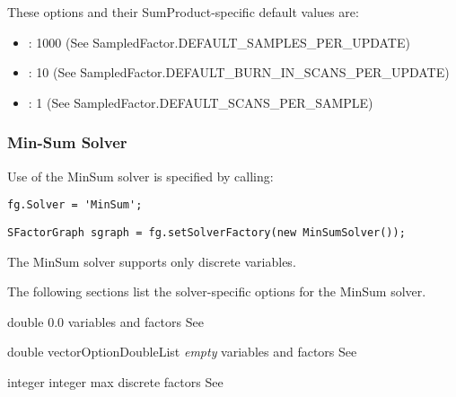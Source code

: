 These options and their SumProduct-specific default values are:

\begin{itemize}
\item {}: 1000 \ifjava (See SampledFactor.DEFAULT\_SAMPLES\_PER\_UPDATE)\fi
\item {}: 10 \ifjava (See SampledFactor.DEFAULT\_BURN\_IN\_SCANS\_PER\_UPDATE)\fi
\item {}: 1 \ifjava (See SampledFactor.DEFAULT\_SCANS\_PER\_SAMPLE)\fi
\end{itemize}

\clearpage
\subsubsection{Min-Sum Solver}

Use of the MinSum solver is specified by calling:

\ifmatlab
\begin{lstlisting}
fg.Solver = 'MinSum';
\end{lstlisting}
\fi

\ifjava
\begin{lstlisting}
SFactorGraph sgraph = fg.setSolverFactory(new MinSumSolver());
\end{lstlisting}
\fi

The MinSum solver supports only discrete variables.

\label{sec:MinSumOptions}

The following sections list the solver-specific options for the MinSum solver.


{double}
{0.0}
{variables and factors}
{See }


{\ifmatlab double vector\fi \ifjava OptionDoubleList\fi}
{\textit{empty}}
{variables and factors}
{See }


{integer}
{integer max}
{discrete factors}
{See }

